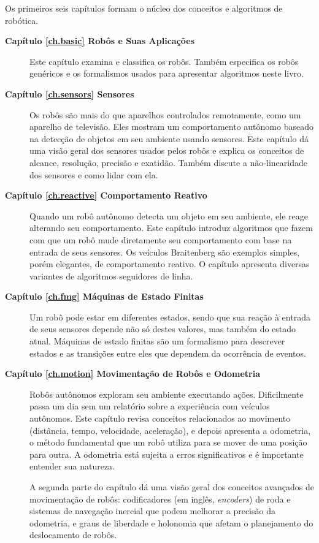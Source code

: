 Os primeiros seis capítulos formam o núcleo dos conceitos e algoritmos de robótica.
\begin{description}
\item [\textbf{Capítulo \ref{ch.basic} Robôs e Suas Aplicações}] Este capítulo examina e classifica os robôs. Também especifica os robôs genéricos e os formalismos usados para apresentar algoritmos neste livro.

\item [\textbf{Capítulo \ref{ch.sensors} Sensores}] Os robôs são mais do que aparelhos controlados remotamente, como um aparelho de televisão. Eles mostram um comportamento autônomo baseado na detecção de objetos em seu ambiente usando sensores. Este capítulo dá uma visão geral dos sensores usados pelos robôs e explica os conceitos de alcance, resolução, precisão e exatidão. Também discute a não-linearidade dos sensores e como lidar com ela.

\item [\textbf{Capítulo \ref{ch.reactive} Comportamento Reativo}] Quando um robô autônomo detecta um objeto em seu ambiente, ele reage alterando seu comportamento. Este capítulo introduz algoritmos que fazem com que um robô mude diretamente seu comportamento com base na entrada de seus sensores. Os veículos Braitenberg são exemplos simples, porém elegantes, de comportamento reativo. O capítulo apresenta diversas variantes de algoritmos seguidores de linha.

\item [\textbf{Capítulo \ref{ch.fmg} Máquinas de Estado Finitas}] Um robô pode estar em diferentes estados, sendo que sua reação à entrada de seus sensores depende não só destes valores, mas também do estado atual. Máquinas de estado finitas são um formalismo para descrever estados e as transições entre eles que dependem da ocorrência de eventos.

\item [\textbf{Capítulo \ref{ch.motion} Movimentação de Robôs e Odometria}] Robôs autônomos exploram seu ambiente executando ações. Dificilmente passa um dia sem um relatório sobre a experiência com veículos autônomos. Este capítulo revisa conceitos relacionados ao movimento (distância, tempo, velocidade, aceleração), e depois apresenta a odometria, o método fundamental que um robô utiliza para se mover de uma posição para outra. A odometria está sujeita a erros significativos e é importante entender sua natureza.

A segunda parte do capítulo dá uma visão geral dos conceitos avançados de movimentação de robôs: codificadores (em inglês, \emph{encoders}) de roda e sistemas de navegação inercial que podem melhorar a precisão da odometria, e graus de liberdade e holonomia que afetam o planejamento do deslocamento de robôs.


\end{description}
